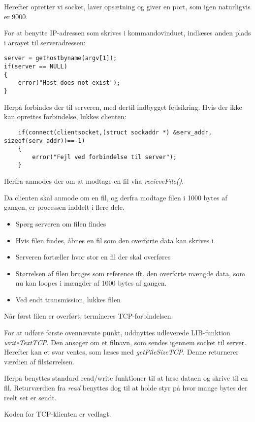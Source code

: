 Herefter opretter vi socket, laver opsætning og giver en port, som igen naturligvis er 9000. 

For at benytte IP-adressen som skrives i kommandovinduet, indlæses anden plads i arrayet til serveradressen:

\begin{lstlisting}
server = gethostbyname(argv[1]);
if(server == NULL)
{
	error("Host does not exist");
}

\end{lstlisting}

Herpå forbindes der til serveren, med dertil indbygget fejlsikring. Hvis der ikke kan oprettes forbindelse, lukkes clienten:

\begin{lstlisting}
	if(connect(clientsocket,(struct sockaddr *) &serv_addr, sizeof(serv_addr))==-1)
	{
		error("Fejl ved forbindelse til server");
	}
\end{lstlisting}

Herfra anmodes der om at modtage en fil vha \textit{recieveFile()}.

Da clienten skal anmode om en fil, og derfra modtage filen i 1000 bytes af gangen, er processen inddelt i flere dele.

\begin{itemize}
	\item Spørg serveren om filen findes
	\item Hvis filen findes, åbnes en fil som den overførte data kan skrives i
	\item Serveren fortæller hvor stor en fil der skal overføres
	\item Størrelsen af filen bruges som reference ift. den overførte mængde data, som nu kan loopes i mængder af 1000 bytes af gangen. 
	\item Ved endt transmission, lukkes filen
\end{itemize}

Når først filen er overført, termineres TCP-forbindelsen. 

For at udføre første ovennævnte punkt, uddnyttes udleverede LIB-funktion \textit{writeTextTCP}. Den ansøger om et filnavn, som sendes igennem socket til server. 
Herefter kan et svar ventes, som læses med \textit{getFileSizeTCP}. Denne returnerer værdien af filstørrelsen. 

Herpå benyttes standard read/write funktioner til at læse dataen og skrive til en fil. 
Returværdien fra \textit{read} benyttes dog til at holde styr på hvor mange bytes der reelt set er sendt. 

Koden for TCP-klienten er vedlagt. 
